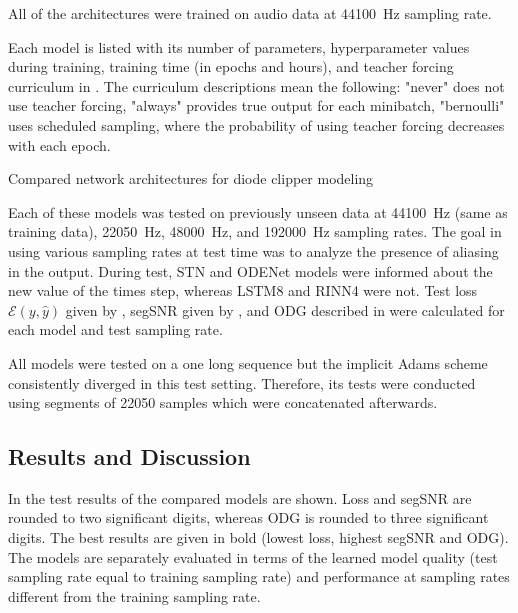 All of the architectures were trained on audio data at \SI{44100}{Hz} sampling rate.

Each model is listed with its number of parameters,
hyperparameter values during training, training time (in epochs and hours), and teacher forcing curriculum in . The curriculum descriptions mean the following: "never" does not use teacher forcing, "always" provides true output for each minibatch, "bernoulli" uses scheduled sampling, where the probability of using teacher forcing decreases with each epoch. 
\begin{table}[]
    \caption{Compared network architectures for diode clipper modeling}
    
    \label{tab:diode_clipper_models_data}
\end{table}

Each of these models was tested on previously unseen data at \SI{44100}{Hz} (same as training data), \SI{22050}{Hz}, \SI{48000}{Hz}, and \SI{192000}{Hz} sampling rates. The goal in using various sampling rates at test time was to analyze the presence of aliasing in the output. During test, \ac{STN} and ODENet models were informed about the new value of the times step, whereas \ac{LSTM}8 and \ac{RINN}4 were not. Test loss $\mathcal{E}(y, \hat{y})$ given by , \ac{segSNR} given by , and \ac{ODG} described in 
were calculated for each model and test sampling rate.

All models were tested on a one long sequence but the implicit Adams scheme consistently diverged in this test setting. Therefore, its tests were conducted using segments of 22050 samples which were concatenated afterwards.

\subsection{Results and Discussion}
\label{sec:diode_clipper_results}

In  the test results of the compared models are shown. Loss and \ac{segSNR} are rounded to two significant digits, whereas \ac{ODG} is rounded to three significant digits. The best results are given in bold (lowest loss, highest \ac{segSNR} and \ac{ODG}). The models are separately evaluated in terms of the learned model quality (test sampling rate equal to training sampling rate) and performance at sampling rates different from the training sampling rate. 

